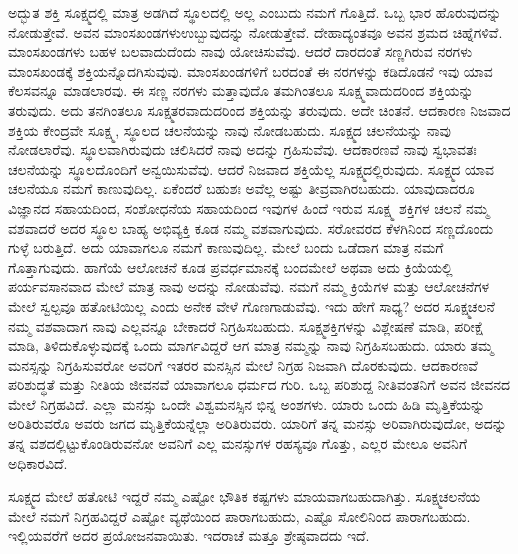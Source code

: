 ಅದ್ಭುತ ಶಕ್ತಿ ಸೂಕ್ಷ್ಮದಲ್ಲಿ ಮಾತ್ರ ಅಡಗಿದೆ ಸ್ಥೂಲದಲ್ಲಿ ಅಲ್ಲ ಎಂಬುದು ನಮಗೆ ಗೊತ್ತಿದೆ. ಒಬ್ಬ ಭಾರ ಹೊರುವುದನ್ನು ನೋಡುತ್ತೇವೆ. ಅವನ ಮಾಂಸಖಂಡಗಳು\break ಉಬ್ಬುವುದನ್ನು ನೋಡುತ್ತೇವೆ. ದೇಹಾದ್ಯಂತವೂ ಅವನ ಶ್ರಮದ ಚಿಹ್ನೆಗಳಿವೆ. ಮಾಂಸಖಂಡಗಳು ಬಹಳ ಬಲವಾದುದೆಂದು ನಾವು ಯೋಚಿಸುವೆವು. ಆದರೆ ದಾರದಂತೆ ಸಣ್ಣಗಿರುವ ನರಗಳು ಮಾಂಸಖಂಡಕ್ಕೆ ಶಕ್ತಿಯನ್ನೊದಗಿಸುವುವು. ಮಾಂಸಖಂಡಗಳಿಗೆ ಬರದಂತೆ ಈ ನರಗಳನ್ನು ಕಡಿದೊಡನೆ ಇವು ಯಾವ ಕೆಲಸವನ್ನೂ ಮಾಡಲಾರವು. ಈ ಸಣ್ಣ ನರಗಳು ಮತ್ತಾವುದೊ ತಮಗಿಂತಲೂ ಸೂಕ್ಷ್ಮವಾದುದರಿಂದ ಶಕ್ತಿಯನ್ನು ತರುವುದು. ಅದು ತನಗಿಂತಲೂ ಸೂಕ್ಷ್ಮತರವಾದುದರಿಂದ ಶಕ್ತಿಯನ್ನು ತರುವುದು. ಅದೇ ಚಿಂತನೆ. ಆದಕಾರಣ ನಿಜವಾದ ಶಕ್ತಿಯ ಕೇಂದ್ರವೇ ಸೂಕ್ಷ್ಮ, ಸ್ಥೂಲದ ಚಲನೆಯನ್ನು ನಾವು ನೋಡಬಹುದು. ಸೂಕ್ಷ್ಮದ ಚಲನೆಯನ್ನು ನಾವು ನೋಡಲಾರೆವು. ಸ್ಥೂಲವಾಗಿರುವುದು ಚಲಿಸಿದರೆ ನಾವು ಅದನ್ನು ಗ್ರಹಿಸುವೆವು. ಆದಕಾರಣವೆ ನಾವು ಸ್ವಭಾವತಃ ಚಲನೆಯನ್ನು ಸ್ಥೂಲದೊಂದಿಗೆ ಅನ್ವಯಿಸುವೆವು. ಆದರೆ ನಿಜವಾದ ಶಕ್ತಿಯೆಲ್ಲ ಸೂಕ್ಷ್ಮದಲ್ಲಿರುವುದು. ಸೂಕ್ಷ್ಮದ ಯಾವ ಚಲನೆಯೂ ನಮಗೆ ಕಾಣುವುದಿಲ್ಲ. ಏಕೆಂದರೆ ಬಹುಶಃ ಅವೆಲ್ಲ ಅಷ್ಟು ತೀವ್ರವಾಗಿರಬಹುದು. ಯಾವುದಾದರೂ ವಿಜ್ಞಾನದ ಸಹಾಯದಿಂದ, ಸಂಶೋಧನೆಯ ಸಹಾಯದಿಂದ ಇವುಗಳ ಹಿಂದೆ ಇರುವ ಸೂಕ್ಷ್ಮ ಶಕ್ತಿಗಳ ಚಲನೆ ನಮ್ಮ ವಶವಾದರೆ ಅದರ ಸ್ಥೂಲ ಬಾಹ್ಯ ಅಭಿವ್ಯಕ್ತಿ ಕೂಡ ನಮ್ಮ ವಶವಾಗುವುದು. ಸರೋವರದ ಕೆಳಗಿನಿಂದ ಸಣ್ಣದೊಂದು ಗುಳ್ಳೆ ಬರುತ್ತಿದೆ. ಅದು ಯಾವಾಗಲೂ ನಮಗೆ ಕಾಣುವುದಿಲ್ಲ. ಮೇಲೆ ಬಂದು ಒಡೆದಾಗ ಮಾತ್ರ ನಮಗೆ ಗೊತ್ತಾಗುವುದು. ಹಾಗೆಯೆ ಆಲೋಚನೆ ಕೂಡ ಪ್ರವರ್ಧಮಾನಕ್ಕೆ ಬಂದಮೇಲೆ ಅಥವಾ ಅದು ಕ್ರಿಯೆಯಲ್ಲಿ ಪರ್ಯವಸಾನವಾದ ಮೇಲೆ ಮಾತ್ರ ನಾವು ಅದನ್ನು ನೋಡುವೆವು. ನಮಗೆ ನಮ್ಮ ಕ್ರಿಯೆಗಳ ಮತ್ತು ಆಲೋಚನೆಗಳ ಮೇಲೆ ಸ್ವಲ್ಪವೂ ಹತೋಟಿಯಿಲ್ಲ ಎಂದು ಅನೇಕ ವೇಳೆ ಗೊಣಗಾಡುವೆವು. ಇದು ಹೇಗೆ ಸಾಧ್ಯ? ಅದರ ಸೂಕ್ಷ್ಮಚಲನೆ ನಮ್ಮ ವಶವಾದಾಗ ನಾವು ಎಲ್ಲವನ್ನೂ ಬೇಕಾದರೆ ನಿಗ್ರಹಿಸಬಹುದು. ಸೂಕ್ಷ್ಮಶಕ್ತಿಗಳನ್ನು ವಿಶ್ಲೇಷಣೆ ಮಾಡಿ, ಪರೀಕ್ಷೆ ಮಾಡಿ, ತಿಳಿದುಕೊಳ್ಳುವುದಕ್ಕೆ ಒಂದು ಮಾರ್ಗವಿದ್ದರೆ ಆಗ ಮಾತ್ರ ನಮ್ಮನ್ನು ನಾವು ನಿಗ್ರಹಿಸಬಹುದು. ಯಾರು ತಮ್ಮ ಮನಸ್ಸನ್ನು ನಿಗ್ರಹಿಸುವರೋ ಅವರಿಗೆ ಇತರರ ಮನಸ್ಸಿನ ಮೇಲೆ ನಿಗ್ರಹ ನಿಜವಾಗಿ ದೊರಕುವುದು. ಆದಕಾರಣವೆ ಪರಿಶುದ್ಧತೆ ಮತ್ತು ನೀತಿಯ ಜೀವನವೆ ಯಾವಾಗಲೂ ಧರ್ಮದ ಗುರಿ. ಒಬ್ಬ ಪರಿಶುದ್ದ ನೀತಿವಂತನಿಗೆ ಅವನ ಜೀವನದ ಮೇಲೆ ನಿಗ್ರಹವಿದೆ. ಎಲ್ಲಾ ಮನಸ್ಸು ಒಂದೇ ವಿಶ್ವಮನಸ್ಸಿನ ಭಿನ್ನ ಅಂಶಗಳು. ಯಾರು ಒಂದು ಹಿಡಿ ಮೃತ್ತಿಕೆಯನ್ನು ಅರಿತಿರುವರೊ ಅವರು ಜಗದ ಮೃತ್ತಿಕೆಯನ್ನೆಲ್ಲಾ ಅರಿತಿರುವರು. ಯಾರಿಗೆ ತನ್ನ ಮನಸ್ಸು ಅರಿವಾಗಿರುವುದೋ, ಅದನ್ನು ತನ್ನ ವಶದಲ್ಲಿಟ್ಟುಕೊಂಡಿರುವನೋ ಅವನಿಗೆ ಎಲ್ಲ ಮನಸ್ಸುಗಳ ರಹಸ್ಯವೂ ಗೊತ್ತು, ಎಲ್ಲರ ಮೇಲೂ ಅವನಿಗೆ ಅಧಿಕಾರವಿದೆ.

\vskip -1pt

ಸೂಕ್ಷ್ಮದ ಮೇಲೆ ಹತೋಟಿ ಇದ್ದರೆ ನಮ್ಮ ಎಷ್ಟೋ ಭೌತಿಕ ಕಷ್ಟಗಳು ಮಾಯವಾಗಬಹುದಾಗಿತ್ತು. ಸೂಕ್ಷ್ಮಚಲನೆಯ ಮೇಲೆ ನಮಗೆ ನಿಗ್ರಹವಿದ್ದರೆ ಎಷ್ಟೋ ವ್ಯಥೆಯಿಂದ ಪಾರಾಗಬಹುದು, ಎಷ್ಟೊ ಸೋಲಿನಿಂದ ಪಾರಾಗಬಹುದು. ಇಲ್ಲಿಯವರೆಗೆ ಅದರ ಪ್ರಯೋಜನವಾಯಿತು. ಇದರಾಚೆ ಮತ್ತೂ ಶ್ರೇಷ್ಠವಾದದು ಇದೆ.

